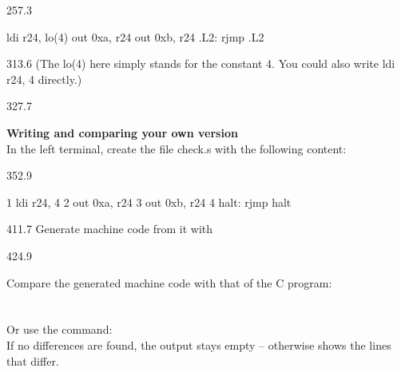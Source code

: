 \documentclass{aslab}
\makeatletter
\newcommand*\aN[1]{\textcolor{codeorange}{#1}}%
\newcommand*\aI[1]{\textcolor{codegreen}{#1}}%
\newcommand*\aK[1]{\textcolor{codered}{#1}}%
\newcommand*\aR[1]{\textcolor{codecyan}{#1}}%
\newenvironment{asmlisting}[1][11]{\par
  \edef\asm@bs{\the\baselineskip}\fontsize{#1bp}{\asm@bs}\selectfont
  \ttfamily\asm@setup}{\par}
\makeatother
\begin{document}
\begin{region}[x=74.7,right=0,pitch=11]{257.3}
\begin{asmlisting}[9]
         \aI{ldi}     \aR{r24},    \aR{lo}(\aK{4})
         \aI{out}     \aK{0xa},    \aR{r24}
         \aI{out}     \aK{0xb},    \aR{r24}
\aN{.L2}:
         \aI{rjmp}    \aN{.L2}
\end{asmlisting}
\end{region}

\begin{region}[x=74.7,right=0]{313.6}
(The lo(4) here simply stands for the constant 4. You could also write
ldi r24, 4 directly.)
\end{region}

\begin{region}[pitch=13.4]{327.7}
\begin{numlist}[start=3]
\item \textbf{Writing and comparing your own version}\\
  In the left terminal, create the file check.s with the following content:
\end{numlist}
\end{region}

\begin{region}[x=74.7,right=0,pitch=11]{352.9}
\begin{asmlisting}[9]
\aN{1}         \aI{ldi}     \aR{r24},    \aK{4}
\aN{2}         \aI{out}     \aK{0xa},    \aR{r24}
\aN{3}         \aI{out}     \aK{0xb},    \aR{r24}
\aN{4 halt:}   \aI{rjmp}    \aR{halt}
\end{asmlisting}
\end{region}

\begin{region}[x=74.7,right=0]{411.7}
Generate machine code from it with 
\end{region}

\begin{region}[x=74.7,right=0,pitch=13.43]{424.9}
\begin{alphasub}
\item Compare the generated machine code with that of the C program:\\
  \\
  \\
  Or use the  command: \\
  If no differences are found, the output stays empty -- otherwise
   shows the lines that differ.
\end{alphasub}
\end{region}
\end{document}
